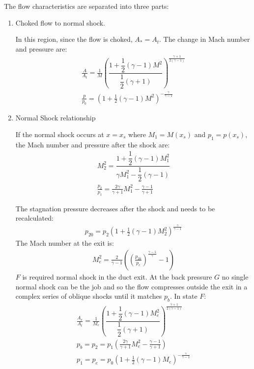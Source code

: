 \documentclass[class=report, crop=false, 12pt,a4paper]{standalone}
\begin{document}
The flow characteristics are separated into three parts:
\begin{enumerate}
    \item Choked flow to normal shock.

          In this region, since the flow is choked, $A_* = A_t$. The change in Mach number and pressure are:
          \begin{gather}
              \frac{A}{A_t} = \frac{1}{M}\left(\dfrac{1 + \dfrac{1}{2}\left(\gamma - 1\right)M^2}{\dfrac{1}{2}\left(\gamma + 1\right)}\right)^{\frac{\gamma + 1}{2\left(\gamma -1\right)}}\\[5pt]
              \frac{p}{p_0} = \left(1 + \frac{1}{2}\left(\gamma -1\right)M^2\right)^{-\frac{\gamma}{\gamma -1}}
          \end{gather}
    \item Normal Shock relationship

          If the normal shock occurs at $x = x_s$ where $M_1 = M(x_s)$ and $p_1 = p(x_s)$, the Mach number and pressure after the shock are:
          \begin{gather}
              M^2_2 = \dfrac{1 + \dfrac{1}{2}\left(\gamma - 1\right)M^2_1}{\gamma M^2_1 - \dfrac{1}{2}\left(\gamma - 1\right)}\\[5pt]
              \frac{p_2}{p_1} = \frac{2\gamma}{\gamma + 1}M^2_1 - \frac{\gamma -1}{\gamma + 1}
          \end{gather}

          The stagnation pressure decreases after the shock and needs to be recalculated:
          \begin{gather}
              p_{20} = p_2 \left(1 + \frac{1}{2}\left(\gamma - 1\right)M^2_2\right)^{\frac{\gamma }{\gamma -1}}
          \end{gather}
          The Mach number at the exit is:
          \begin{gather}
              M^2_e = \frac{2}{\gamma - 1}\left(\left(\frac{p_{20}}{p_e}\right)^{\frac{\gamma -1}{\gamma}}-1\right)
          \end{gather}
          $F$ is required normal shock in the duct exit. At the back pressure $G$ no single normal shock can be the job and so the flow compresses outside the exit in a complex series of oblique shocks until it matches $p_b$. In state $F$:
          \begin{gather}
              \frac{A_e}{A_t} = \frac{1}{M_e}\left(\dfrac{1+ \dfrac{1}{2}\left(\gamma -1\right)M^2_e}{\dfrac{1}{2}\left(\gamma + 1\right)}\right)^{\frac{\gamma + 1}{2\left(\gamma - 1\right)}}\\[5pt]
              p_b = p_2 = p_1 \left(\frac{2\gamma}{\gamma + 1}M^2_e-\frac{\gamma -1}{\gamma + 1}\right)\\[5pt]
              p_1 = p_e = p_0\left(1 + \frac{1}{2}\left(\gamma - 1\right)M_e\right)^{-\frac{\gamma}{\gamma -1}}
          \end{gather}
\end{enumerate}
\end{document}
